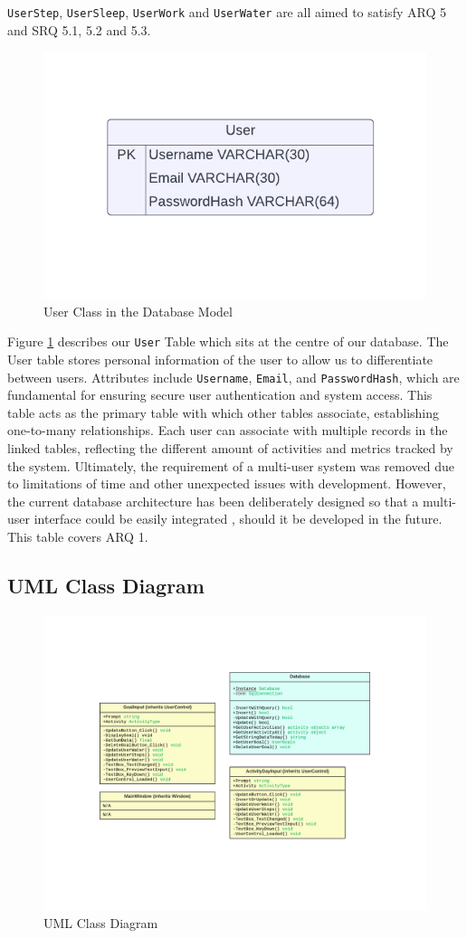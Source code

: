 \documentclass[11pt]{article}
\begin{document}
\texttt{UserStep}, \texttt{UserSleep}, \texttt{UserWork} and \texttt{UserWater}
are all aimed to satisfy ARQ 5 and SRQ 5.1, 5.2 and 5.3.

\begin{figure}[!ht]
  \centering
  \includegraphics[width = 0.4\linewidth]{PI Systems Database-2}
  \caption{User Class in the Database Model}
  \label{fig:User_Table}
\end{figure}

Figure \ref{fig:User_Table} describes our \texttt{User} Table which sits at the centre of our database. 
The User table stores personal information of the user to allow us to differentiate between users. Attributes include \texttt{Username}, \texttt{Email}, and
\texttt{PasswordHash}, which are fundamental for ensuring secure user authentication and
system access. This table acts as the primary table with which other tables
associate, establishing one-to-many relationships. Each user can associate with multiple records in the
linked tables, reflecting the different amount of activities and metrics tracked by the
system. Ultimately, the requirement of a multi-user system was removed due to
limitations of time and other unexpected issues with development. However, the current database
architecture has been deliberately designed so that a multi-user interface could be easily integrated
, should it be developed in the future.
This table covers ARQ 1.

\subsection{UML Class Diagram}

\begin{figure}[!ht]
  \centering
  \includegraphics[width = 0.7\linewidth]{UML Class diagram}
  \caption{UML Class Diagram}
  \label{fig:Class}
\end{figure}
\end{document}
